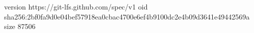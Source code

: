 version https://git-lfs.github.com/spec/v1
oid sha256:2bf0fa9d0e04bef57918ea0cbac4700e6ef4b9100dc2e4b09d3641e49442569a
size 87506
